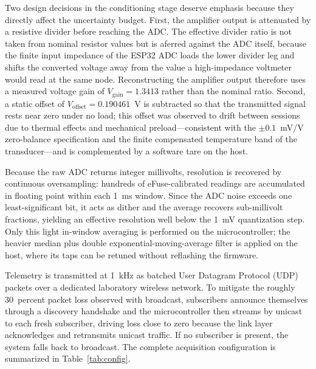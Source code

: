 \documentclass[conference]{IEEEtran}
\begin{document}
Two design decisions in the conditioning stage deserve emphasis because they directly affect the uncertainty budget. First, the amplifier output is attenuated by a resistive divider before reaching the ADC. The effective divider ratio is not taken from nominal resistor values but is aferred against the ADC itself, because the finite input impedance of the ESP32 ADC loads the lower divider leg and shifts the converted voltage away from the value a high-impedance voltmeter would read at the same node. Reconstructing the amplifier output therefore uses a measured voltage gain of $V_{\mathrm{gain}}=1.3413$ rather than the nominal ratio. Second, a static offset of $V_{\mathrm{offset}}=0.190461$~V is subtracted so that the transmitted signal rests near zero under no load; this offset was observed to drift between sessions due to thermal effects and mechanical preload---consistent with the $\pm0.1$~mV/V zero-balance specification and the finite compensated temperature band of the transducer---and is complemented by a software tare on the host.

Because the raw ADC returns integer millivolts, resolution is recovered by continuous oversampling: hundreds of eFuse-calibrated readings are accumulated in floating point within each 1~ms window. Since the ADC noise exceeds one least-significant bit, it acts as dither and the average recovers sub-millivolt fractions, yielding an effective resolution well below the 1~mV quantization step. Only this light in-window averaging is performed on the microcontroller; the heavier median plus double exponential-moving-average filter is applied on the host, where its taps can be retuned without reflashing the firmware.

Telemetry is transmitted at 1~kHz as batched User Datagram Protocol (UDP) packets over a dedicated laboratory wireless network. To mitigate the roughly 30~percent packet loss observed with broadcast, subscribers announce themselves through a discovery handshake and the microcontroller then streams by unicast to each fresh subscriber, driving loss close to zero because the link layer acknowledges and retransmits unicast traffic. If no subscriber is present, the system falls back to broadcast. The complete acquisition configuration is summarized in Table~\ref{tab:config}.
\end{document}
